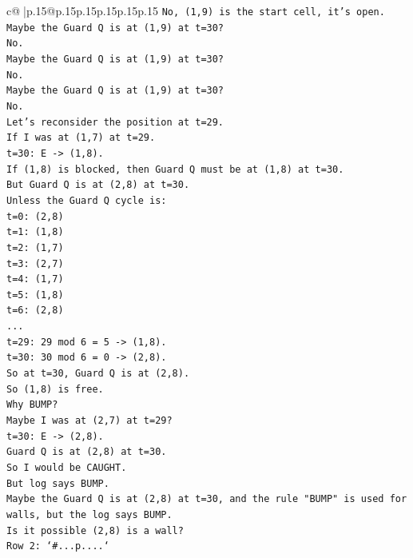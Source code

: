 \documentclass{article}
\begin{document}
{\begin{supertabular}{c@{$\;$}|p{.15\linewidth}@{}p{.15\linewidth}p{.15\linewidth}p{.15\linewidth}p{.15\linewidth}p{.15\linewidth}}
{{{\texttt{No, (1,9) is the start cell, it's open.} \\
\texttt{Maybe the Guard Q is at (1,9) at t=30?} \\
\texttt{No.} \\
\texttt{Maybe the Guard Q is at (1,9) at t=30?} \\
\texttt{No.} \\
\texttt{Maybe the Guard Q is at (1,9) at t=30?} \\
\texttt{No.} \\
\texttt{Let's reconsider the position at t=29.} \\
\texttt{If I was at (1,7) at t=29.} \\
\texttt{t=30: E {-}> (1,8).} \\
\texttt{If (1,8) is blocked, then Guard Q must be at (1,8) at t=30.} \\
\texttt{But Guard Q is at (2,8) at t=30.} \\
\texttt{Unless the Guard Q cycle is:} \\
\texttt{t=0: (2,8)} \\
\texttt{t=1: (1,8)} \\
\texttt{t=2: (1,7)} \\
\texttt{t=3: (2,7)} \\
\texttt{t=4: (1,7)} \\
\texttt{t=5: (1,8)} \\
\texttt{t=6: (2,8)} \\
\texttt{...} \\
\texttt{t=29: 29 mod 6 = 5 {-}> (1,8).} \\
\texttt{t=30: 30 mod 6 = 0 {-}> (2,8).} \\
\texttt{So at t=30, Guard Q is at (2,8).} \\
\texttt{So (1,8) is free.} \\
\texttt{Why BUMP?} \\
\texttt{Maybe I was at (2,7) at t=29?} \\
\texttt{t=30: E {-}> (2,8).} \\
\texttt{Guard Q is at (2,8) at t=30.} \\
\texttt{So I would be CAUGHT.} \\
\texttt{But log says BUMP.} \\
\texttt{Maybe the Guard Q is at (2,8) at t=30, and the rule "BUMP" is used for walls, but the log says BUMP.} \\
\texttt{Is it possible (2,8) is a wall?} \\
\texttt{Row 2: `\#...p....`} \\
}}}
\end{supertabular}}
\end{document}

